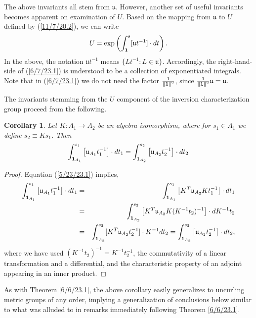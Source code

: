 \documentclass{amsart}
\numberwithin{equation}{section}
\newtheorem{corollary}[theorem]{Corollary}
\theoremstyle{definition}
\numberwithin{theorem}{section}
\begin{document}
The above invariants all stem from $\mathfrak{u}$.  However, another set of useful invariants becomes apparent on examination of $ U$.  Based on the mapping from $\mathfrak{u}$ to $ U$ defined by (\ref{11/7/20.2}),  we can write \begin{equation}  U = \exp\left(\int_{\bf 1}^s [\mathfrak{u}t^{-1}]\cdot dt\right). \label{6/7/23.1}\end{equation}  In the above, the notation $\mathfrak{u}t^{-1}$ means $\{Lt^{-1}: L\in \mathfrak{u}\}$.  Accordingly, the right-hand-side of (\ref{6/7/23.1}) is understood to be a collection of exponentiated integrals.   Note that in (\ref{6/7/23.1}) we do not need the factor $\frac{1}{\|{\bf 1}\|^2}$, since $\frac{1}{\|{\bf 1}\|^2}\mathfrak{u}=\mathfrak{u}$.  

The invariants stemming from the $U$ component of the inversion characterization group proceed from the following. 


\begin{corollary}\label{6/6/23.2} Let $K:A_1\rightarrow A_2$ be an algebra isomorphism, where for $s_1\in A_1$ we define $s_2\equiv Ks_1$.  Then \[ \int_{{\bf 1}_{A_1}}^{s_1} \left[\mathfrak{u}_{A_1}t_1^{-1}\right]\cdot dt_1 
= \int_{{\bf 1}_{A_2}}^{s_2} \left[\mathfrak{u}_{A_2}t_2^{-1}\right]\cdot dt_2  \] \end{corollary}

\begin{proof} 
Equation (\ref{5/23/23.1}) implies,
\begin{eqnarray*} \int_{{\bf 1}_{A_1}}^{s_1} \left[\mathfrak{u}_{A_1}t_1^{-1}\right]\cdot dt_1 &=& \int_{{\bf 1}_{A_1}}^{s_1} \left[ K^T\mathfrak{u}_{A_2}Kt_1^{-1}\right]\cdot dt_1 \\ &=& 
\int_{{\bf 1}_{A_2}}^{s_2} \left[ K^T\mathfrak{u}_{A_2}K (K^{-1}t_2)^{-1}\right]\cdot dK^{-1}t_2 \\ &=& \int_{{\bf 1}_{A_2}}^{s_2} [K^T\mathfrak{u}_{A_2}t_2^{-1}]\cdot K^{-1}dt_2 = \int_{{\bf 1}_{A_2}}^{s_2} \left[\mathfrak{u}_{A_2}t_2^{-1}\right]\cdot dt_2, 
\end{eqnarray*}
where we have used $(K^{-1}t_2)^{-1} = K^{-1}t_2^{-1}$, the commutativity of a linear transformation and a differential, and the characteristic property of an adjoint appearing in an inner product.
\end{proof}

As with Theorem \ref{6/6/23.1}, the above corollary easily generalizes to uncurling metric groups of any order, implying a generalization of conclusions below similar to what was alluded to in remarks immediately following Theorem \ref{6/6/23.1}.
\end{document}

